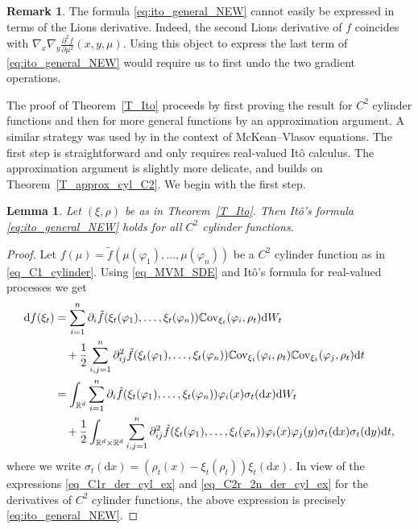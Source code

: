 \documentclass{article}
\newtheorem{lemma}[theorem]{Lemma}
\theoremstyle{definition}
\newtheorem{remark}[theorem]{\textbf{Remark}}
\numberwithin{equation}{section}
\numberwithin{theorem}{section}
\newcommand{\R}{\mathbb{R}}
\newcommand{\dx}{\mathrm{d}x}
\newcommand{\dy}{\mathrm{d}y}
\newcommand{\dt}{\mathrm{d}t}
\newcommand{\Cov}{\mathbb{C}\mathrm{ov}}
\renewcommand{\d}{{\rm d}}
\begin{document}
\begin{remark}
The formula \eqref{eq:ito_general_NEW} cannot easily be expressed in terms of the Lions derivative. Indeed, the second Lions derivative of $f$ coincides with $\nabla_x \nabla_y \frac{\partial^2 f}{\partial\mu^2}(x,y,\mu)$. Using this object to express the last term of \eqref{eq:ito_general_NEW} would require us to first undo the two gradient operations. %
\end{remark}



The proof of Theorem~\ref{T_Ito} proceeds by first proving the result for $C^2$ cylinder functions and then for more general functions by an approximation argument. A similar strategy was used by \cite{guo_pha_wei_20} in the context of McKean--Vlasov equations. The first step is straightforward and only requires real-valued It\^o calculus. The approximation argument is slightly more delicate, and builds on Theorem~\ref{T_approx_cyl_C2}. We begin with the first step.



\begin{lemma}\label{L_Ito_D}
Let $(\xi,\rho)$ be as in Theorem~\ref{T_Ito}. Then It\^o's formula \eqref{eq:ito_general_NEW} holds for all $C^2$ cylinder functions.
\end{lemma}

\begin{proof}
Let $f(\mu) = \tilde f(\mu(\varphi_1),\ldots,\mu(\varphi_n))$ be a $C^2$ cylinder function as in \eqref{eq_C1_cylinder}. Using \eqref{eq_MVM_SDE} and It\^o's formula for real-valued processes we get
\begin{align*}
\d f(\xi_t) &= \sum_{i=1}^n \partial_i \tilde f(\xi_t(\varphi_1),\ldots,\xi_t(\varphi_n)) \Cov_{\xi_t}(\varphi_i,\rho_t) \d W_t \\
&\quad + \frac12 \sum_{i,j=1}^n \partial^2_{ij}\tilde f(\xi_t(\varphi_1),\ldots,\xi_t(\varphi_n)) \Cov_{\xi_t}(\varphi_i,\rho_t) \Cov_{\xi_t}(\varphi_j,\rho_t) \dt \\
&= \int_{\R^d} \sum_{i=1}^n \partial_i \tilde f(\xi_t(\varphi_1),\ldots,\xi_t(\varphi_n)) \varphi_i(x) \sigma_t(\dx) \d W_t \\
&\quad + \frac12 \int_{{\R^d}\times {\R^d}} \sum_{i,j=1}^n \partial^2_{ij}\tilde f(\xi_t(\varphi_1),\ldots,\xi_t(\varphi_n)) \varphi_i(x) \varphi_j(y)\sigma_t(\dx)\sigma_t(\dy) \dt,
\end{align*}
where we write $\sigma_t(\dx)=(\rho_t(x)-\xi_t(\rho_t))\xi_t(\dx)$. In view of the expressions \eqref{eq_C1r_der_cyl_ex} and \eqref{eq_C2r_2n_der_cyl_ex} for the derivatives of $C^2$ cylinder functions, the above expression is precisely \eqref{eq:ito_general_NEW}.
\end{proof}
\end{document}

